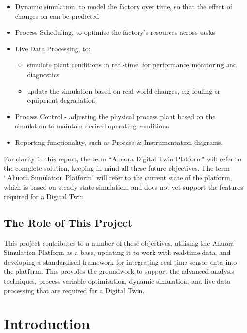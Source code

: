 \documentclass[12pt]{report}
\begin{document}
\begin{itemize}
    \item Dynamic simulation, to model the factory over time, so that the effect of changes on can be predicted
    \item Process Scheduling, to optimise the factory's resources across tasks
    \item Live Data Processing, to:
          \begin{itemize}
              \item simulate plant conditions in real-time, for performance monitoring and diagnostics
              \item update the simulation based on real-world changes, e.g fouling or equipment degradation
          \end{itemize}
    \item Process Control - adjusting the physical process plant based on the simulation to maintain desired operating conditions
    \item Reporting functionality, such as Process \& Instrumentation diagrams.
\end{itemize}

For clarity in this report, the term ``Ahuora Digital Twin Platform" will refer to the complete solution, keeping in mind all these future objectives. The term ``Ahuora Simulation Platform" will refer to the current state of the platform, which is based on steady-state simulation, and does not yet support the features required for a Digital Twin.

\section{The Role of This Project}

This project contributes to a number of these objectives, utilising the Ahuora Simulation Platform as a base, updating it to work with real-time data, and developing a standardised framework for integrating real-time sensor data into the platform. This provides the groundwork to support the advanced analysis techniques, process variable optimisation, dynamic simulation, and live data processing that are required for a Digital Twin.

\chapter{Introduction}

\end{document}
